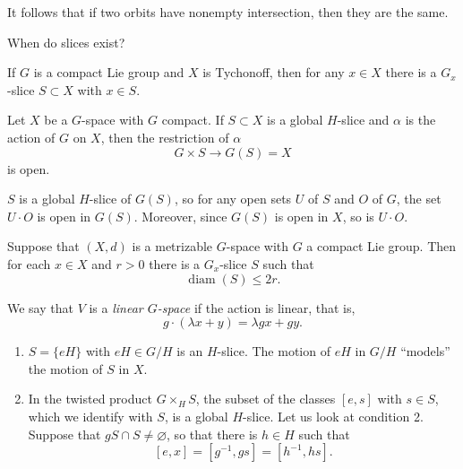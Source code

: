 It follows that if two orbits have
nonempty intersection, then they are
the same.

When do slices exist?

\begin{theorem}
\label{theorem-slice-first}
If $G$ is a compact Lie group and $X$
is Tychonoff, then for any $x\in X$
there is a $G_x$-slice $S\subset X$
with $x\in S$.
\end{theorem}

\begin{proposition}
\label{proposition-action-on-slice-open}
Let $X$ be a $G$-space with $G$
compact. If $S\subset X$ is a global
$H$-slice and $\alpha$ is the action of
$G$ on $X$, then the restriction of
$\alpha$
$$
G\times S\to G(S)=X
$$
is open.
\end{proposition}

\begin{remark}
\label{remark-slice-of-saturation}
$S$ is a global $H$-slice of $G(S)$, so
for any open sets $U$ of $S$ and $O$ of
$G$, the set $U\cdot O$ is open in
$G(S)$. Moreover, since $G(S)$ is open
in $X$, so is $U\cdot O$.
\end{remark}

\begin{proposition}
\label{proposition-small-slices}
Suppose that $(X,d)$ is a metrizable
$G$-space with $G$ a compact Lie group.
Then for each $x\in X$ and $r>0$ there
is a $G_x$-slice $S$ such that
$$
\operatorname{diam}(S)\leq2r.
$$
\end{proposition}

\begin{definition}
\label{definition-linear-g-space}
We say that $V$ is a
{\it linear $G$-space} if the action is
linear, that is,
$$
g\cdot(\lambda x+y)
=\lambda gx+gy.
$$
\end{definition}

\begin{example}
\label{example-slices}
\begin{enumerate}
\item $S=\{eH\}$ with $eH\in G/H$ is an
$H$-slice. The motion of $eH$ in $G/H$
``models'' the motion of $S$ in $X$.
\item In the twisted product
$G\times_HS$, the subset of the classes
$[e,s]$ with $s\in S$, which we
identify with $S$, is a global
$H$-slice. Let us look at condition 2.
Suppose that
$gS\cap S\neq\varnothing$, so that
there is $h\in H$ such that
$$
[e,x]=[g^{-1},gs]=[h^{-1},hs].
$$
\end{enumerate}
\end{example}


